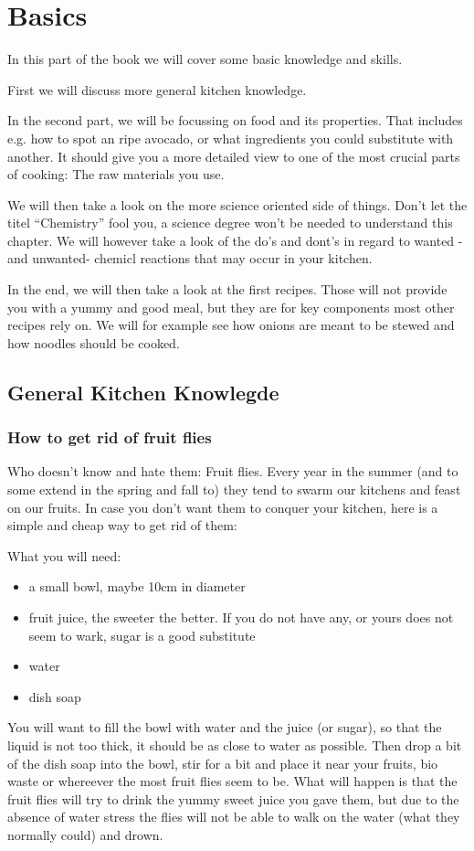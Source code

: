 \section{Basics}
In this part of the book we will cover some basic knowledge and skills.

First we will discuss more general kitchen knowledge. %

In the second part, we will be focussing on food and its properties. That includes e.g. how to spot an ripe avocado, or what ingredients you could substitute with another. It should give you a more detailed view to one of the most crucial parts of cooking: The raw materials you use.

We will then take a look on the more science oriented side of things. Don't let the titel ``Chemistry'' fool you, a science degree won't be needed to understand this chapter. We will however take a look of the do's and dont's in regard to wanted -and unwanted- chemicl reactions that may occur in your kitchen.

In the end, we will then take a look at the first recipes. Those will not  provide you with a yummy and good meal, but they are for key components most other recipes rely on. We will for example see how onions are meant to be stewed and how noodles should be cooked.

\subsection{General Kitchen Knowlegde}

\subsubsection{How to get rid of fruit flies}

Who doesn't know and hate them: Fruit flies. Every year in the summer (and to some extend in the spring and fall to) they tend to swarm our kitchens and feast on our fruits. In case you don't want them to conquer your kitchen, here is a simple and cheap way to get rid of them:

What you will need:
\begin{itemize}
	\item a small bowl, maybe 10cm in diameter
	\item fruit juice, the sweeter the better. If you do not have any, or yours does not seem to wark, sugar is a good substitute
	\item water
	\item dish soap
\end{itemize}
You will want to fill the bowl with water and the juice (or sugar), so that the liquid is not too thick, it should be as close to water as possible. Then drop a bit of the dish soap into the bowl, stir for a bit and place it near your fruits, bio waste or whereever the most fruit flies seem to be. What will happen is that the fruit flies will try to drink the yummy sweet juice you gave them, but due to the absence of water stress the flies will not be able to walk on the water (what they normally could) and drown.

